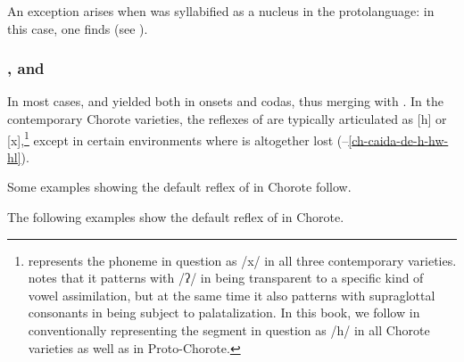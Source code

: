 An exception arises when  was syllabified as a nucleus in the protolanguage: in this case, one finds  (see ).

\subsubsection{,  and }\label{ch-j-jj}

In most cases,  and  yielded  both in onsets and codas, thus merging with . In the contemporary Chorote varieties, the reflexes of  are typically articulated as [h] or [x],\footnote{\citet{AG83} represents the phoneme in question as /x/ in all three contemporary varieties. \citet[79]{JC14b} notes that it patterns with /ʔ/ in being transparent to a specific kind of vowel assimilation, but at the same time it also patterns with supraglottal consonants in being subject to palatalization. In this book, we follow \citep{JC14b} in conventionally representing the segment in question as /h/ in all Chorote varieties as well as in Proto-Chorote.} except in certain environments where  is altogether lost (--\ref{ch-caida-de-h-hw-hl}).

Some examples showing the default reflex of  in Chorote follow.

\begin{exe}
    \ex \bite
    \ex \cutdown
    \ex \rightn
    \ex \fieldn
    \ex \truev
    \ex \hole
    \ex \arrowkaxe
    \ex \youngerbro
    \ex \wash
    \ex \bow
    \ex \languageword
    \ex \smelln
    \ex \pathn
    \ex \abdcavity
    \ex \carrysh
    \ex \dig
    \ex \burrow
    \ex \stagnant
    \ex \night
    \ex \headn
    \ex \jelayuk
    \ex \vrbpl
    \ex \grass
    \ex \maguari
    \ex \skin
\end{exe}

The following examples show the default reflex of  in Chorote.

\begin{exe}
    \ex \fatv
    \ex \crab
    \ex \north
    \ex \suncho
    \ex \sandisaj
    \ex \dividev
    \ex \barnowl
    \ex \oldn
    \ex \quick
    \ex \jabiru
    \ex \anteater
    \ex \pseudo
    \ex \shoot
    \ex \smoke
    \ex \fullriver
    \ex \tired
    \ex \rhea
    \ex \night
    \ex \tuscaf
    \ex \caracara
    \ex \jararaca
    \ex \peccary
    \ex \mistolf
    \ex \hurt
    \ex \argentineboa
    \ex \chaguara
    \ex \wildbean
    \ex \widower
    \ex \firei
    \ex \bro
    \ex \puma
\end{exe}

